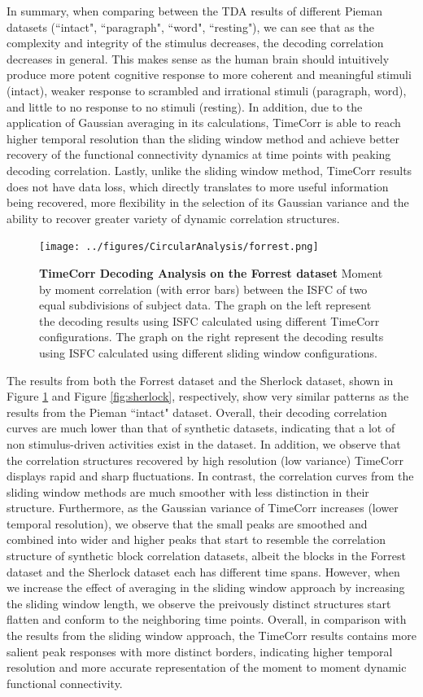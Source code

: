 \documentclass[11pt]{article}
\begin{document}
In summary, when comparing between the TDA results of different Pieman datasets (``intact", ``paragraph", ``word", ``resting"), we can see that as the complexity and integrity of the stimulus decreases, the decoding correlation decreases in general. This makes sense as the human brain should intuitively produce more potent cognitive response to more coherent and meaningful stimuli (intact), weaker response to scrambled and irrational stimuli (paragraph, word), and little to no response to no stimuli (resting). In addition, due to the application of Gaussian averaging in its calculations, TimeCorr is able to reach higher temporal resolution than the sliding window method and achieve better recovery of the functional connectivity dynamics at time points with peaking decoding correlation. Lastly, unlike the sliding window method, TimeCorr results does not have data loss, which directly translates to more useful information being recovered, more flexibility in the selection of its Gaussian variance and the ability to recover greater variety of dynamic correlation structures.

\begin{figure}[!htb]
\texttt{[image: ../figures/CircularAnalysis/forrest.png]}
\caption{\textbf{TimeCorr Decoding Analysis on the Forrest dataset} Moment by moment correlation (with error bars) between the ISFC of two equal subdivisions of subject data. The graph on the left represent the decoding results using ISFC calculated using different TimeCorr configurations. The graph on the right represent the decoding results using ISFC calculated using different sliding window configurations.}
\label{fig:forrest}
\end{figure}

The results from both the Forrest dataset and the Sherlock dataset, shown in Figure \ref{fig:forrest} and Figure \ref{fig:sherlock}, respectively, show very similar patterns as the results from the Pieman ``intact" dataset. Overall, their decoding correlation curves are much lower than that of synthetic datasets, indicating that a lot of non stimulus-driven activities exist in the dataset. In addition, we observe that the correlation structures recovered by high resolution (low variance) TimeCorr displays rapid and sharp fluctuations. In contrast, the correlation curves from the sliding window methods are much smoother with less distinction in their structure. Furthermore, as the Gaussian variance of TimeCorr increases (lower temporal resolution), we observe that the small peaks are smoothed and combined into wider and higher peaks that start to resemble the correlation structure of synthetic block correlation datasets, albeit the blocks in the Forrest dataset and the Sherlock dataset each has different time spans. However, when we increase the effect of averaging in the sliding window approach by increasing the sliding window length, we observe the preivously distinct structures start flatten and conform to the neighboring time points. Overall, in comparison with the results from the sliding window approach, the TimeCorr results contains more salient peak responses with more distinct borders, indicating higher temporal resolution and more accurate representation of the moment to moment dynamic functional connectivity.
\end{document}

